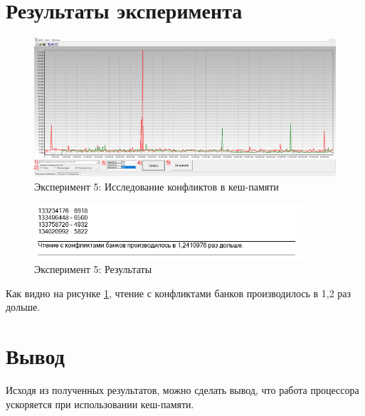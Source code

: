 \section{Результаты эксперимента}
\begin{figure}[ht!]
    \centering
    \includegraphics[width=170mm]{./img/5.png}
    \caption{Эксперимент 5: Исследование конфликтов в кеш-памяти}
\end{figure}

\begin{figure}[ht!]
    \centering
    \includegraphics[width=100mm]{./img/05.png}
    \caption{Эксперимент 5: Результаты\label{res_05}}
\end{figure}

Как видно на рисунке \ref{res_05}, чтение с конфликтами банков производилось в 1,2 раз дольше.

\section{Вывод}
Исходя из полученных результатов, можно сделать вывод, что работа процессора ускоряется при использовании кеш-памяти.